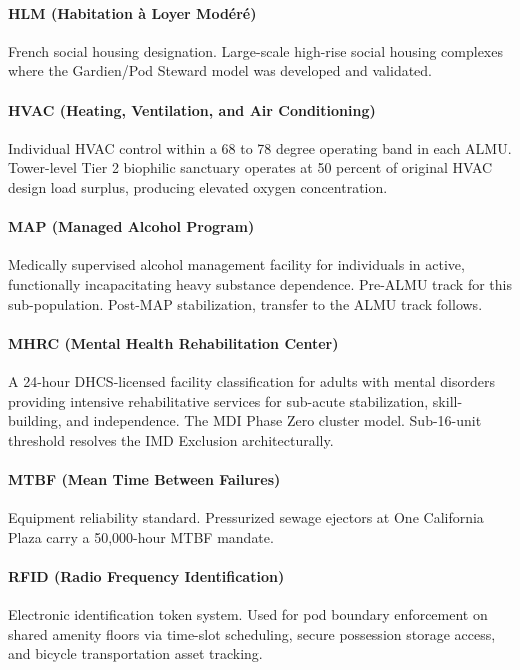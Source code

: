 {\paragraph{HLM (Habitation \`{a} Loyer Mod\'{e}r\'{e})} French social housing designation. Large-scale high-rise social housing complexes where the Gardien/Pod Steward model was developed and validated.

\paragraph{HVAC (Heating, Ventilation, and Air Conditioning)} Individual HVAC control within a 68 to 78 degree operating band in each ALMU. Tower-level Tier 2 biophilic sanctuary operates at 50 percent of original HVAC design load surplus, producing elevated oxygen concentration.

\paragraph{MAP (Managed Alcohol Program)} Medically supervised alcohol management facility for individuals in active, functionally incapacitating heavy substance dependence. Pre-ALMU track for this sub-population. Post-MAP stabilization, transfer to the ALMU track follows.

\paragraph{MHRC (Mental Health Rehabilitation Center)} A 24-hour DHCS-licensed facility classification for adults with mental disorders providing intensive rehabilitative services for sub-acute stabilization, skill-building, and independence. The MDI Phase Zero cluster model. Sub-16-unit threshold resolves the IMD Exclusion architecturally.

\paragraph{MTBF (Mean Time Between Failures)} Equipment reliability standard. Pressurized sewage ejectors at One California Plaza carry a 50,000-hour MTBF mandate.

\paragraph{RFID (Radio Frequency Identification)} Electronic identification token system. Used for pod boundary enforcement on shared amenity floors via time-slot scheduling, secure possession storage access, and bicycle transportation asset tracking.

}
